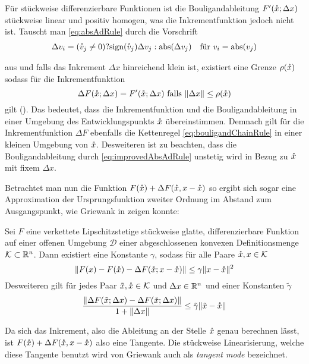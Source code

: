 Für stückweise differenzierbare Funktionen ist die Bouligandableitung $F'(\mathring{x};\Delta x)$ stückweise linear und positiv homogen, was die Inkrementfunktion jedoch nicht ist.
Tauscht man \eqref{eq:absAdRule} durch die Vorschrift
\begin{equation}
 \label{eq:improvedAbsAdRule}
 \begin{aligned}
  \Delta v_i &= (\mathring{v}_j \neq 0)?\text{sign}(\mathring{v}_j)\Delta v_j:\operatorname{abs}(\Delta v_j) &\text{für } v_i = \operatorname{abs}(v_j)
 \end{aligned}
\end{equation}

aus und falls das Inkrement $\Delta x$ hinreichend klein ist, existiert eine Grenze $\rho(\mathring{x})$ sodass für die Inkrementfunktion 
 \[
  \Delta F(\mathring{x};\Delta x) = F'(\mathring{x};\Delta x)\text{ falls }\|\Delta x\|\leq \rho(\mathring{x})
 \]
gilt  (\cite[S.10 ff]{monster}). Das bedeutet, dass die Inkrementfunktion und die Bouligandableitung in einer Umgebung des Entwicklungspunkts $\mathring{x}$ übereinstimmen. Demnach gilt für die Inkrementfunktion $\Delta F$ ebenfalls die Kettenregel \eqref{eq:bouligandChainRule} in einer kleinen Umgebung von $\mathring{x}$. Desweiteren ist zu beachten, dass die Bouligandableitung durch \eqref{eq:improvedAbsAdRule} unstetig wird in Bezug zu $\mathring{x}$ mit fixem $\Delta x$. 

Betrachtet man nun die Funktion $F(\mathring{x})+\Delta F(\mathring{x}, x-\mathring{x})$ so ergibt sich sogar eine Approximation der Ursprungsfunktion zweiter Ordnung im Abstand zum Ausgangspunkt, wie Griewank in \cite[Prop.1]{monster} zeigen konnte:

\begin{theorem}
\label{thm:quadrApproxPL}
 Sei $F$ eine verkettete Lipschitzstetige stückweise glatte, differenzierbare Funktion auf einer offenen Umgebung $\mathcal D$ einer abgeschlossenen konvexen Definitionsmenge $\mathcal K \subset \mathbb{R}^n$. Dann existiert eine Konstante $\gamma$, sodass für alle Paare $\mathring{x},x\in \mathcal K$
 \[
  \|F(x) - F(\mathring{x}) - \Delta F(\mathring{x};x-\mathring{x})\| \leq \gamma \|x-\mathring{x}\|^2
 \]
 Desweiteren gilt für jedes Paar $\tilde x,\mathring{x}\in \mathcal K$ und $\Delta x\in \mathbb{R}^n$ und einer Konstanten $\tilde\gamma$
 \[
  \frac{\|\Delta F(\tilde x;\Delta x) - \Delta F(\mathring{x};\Delta x)\|}{1+\|\Delta x\|}\leq \tilde \gamma \|\tilde x - \mathring{x}\|
 \]
\end{theorem}
Da sich das Inkrement, also die Ableitung an der Stelle $\mathring{x}$ genau berechnen lässt, ist $F(\mathring{x})+\Delta F(\mathring{x}, x-\mathring{x})$ also eine Tangente. Die stückweise Linearisierung, welche diese Tangente benutzt wird von Griewank auch als \textit{tangent mode} bezeichnet. 

